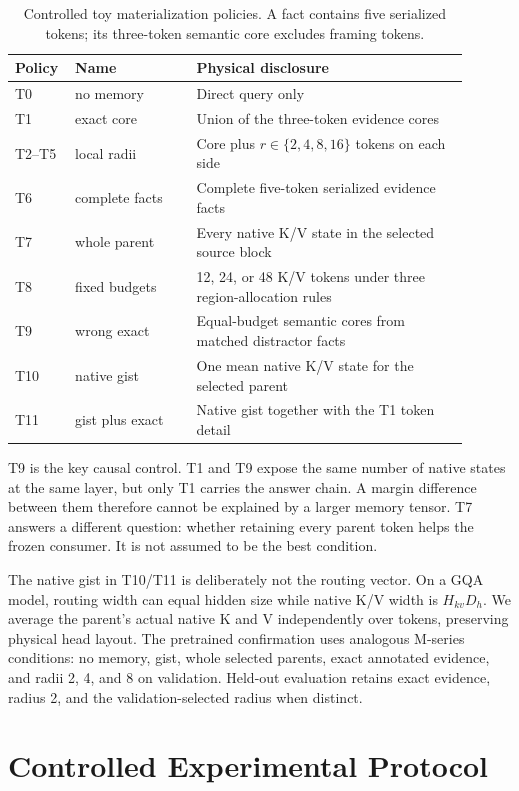 \documentclass[11pt]{article}
\begin{document}
\begin{table}[H]
\centering
\caption{Controlled toy materialization policies.  A fact contains five serialized tokens; its
three-token semantic core excludes framing tokens.}
\label{tab:policies}
\small
\begin{tabular}{p{0.09\linewidth}p{0.25\linewidth}p{0.56\linewidth}}
\toprule
Policy & Name & Physical disclosure \\
\midrule
T0 & no memory & Direct query only \\
T1 & exact core & Union of the three-token evidence cores \\
T2--T5 & local radii & Core plus $r\in\{2,4,8,16\}$ tokens on each side \\
T6 & complete facts & Complete five-token serialized evidence facts \\
T7 & whole parent & Every native K/V state in the selected source block \\
T8 & fixed budgets & 12, 24, or 48 K/V tokens under three region-allocation rules \\
T9 & wrong exact & Equal-budget semantic cores from matched distractor facts \\
T10 & native gist & One mean native K/V state for the selected parent \\
T11 & gist plus exact & Native gist together with the T1 token detail \\
\bottomrule
\end{tabular}
\end{table}

T9 is the key causal control.  T1 and T9 expose the same number of native states at the same layer,
but only T1 carries the answer chain.  A margin difference between them therefore cannot be
explained by a larger memory tensor.  T7 answers a different question: whether retaining every
parent token helps the frozen consumer.  It is not assumed to be the best condition.

The native gist in T10/T11 is deliberately not the routing vector.  On a GQA model, routing width
can equal hidden size while native K/V width is $H_{kv}D_h$.  We average the parent's actual native
K and V independently over tokens, preserving physical head layout.  The pretrained confirmation
uses analogous M-series conditions: no memory, gist, whole selected parents, exact annotated
evidence, and radii 2, 4, and 8 on validation.  Held-out evaluation retains exact evidence,
radius 2, and the validation-selected radius when distinct.

\section{Controlled Experimental Protocol}
\end{document}
